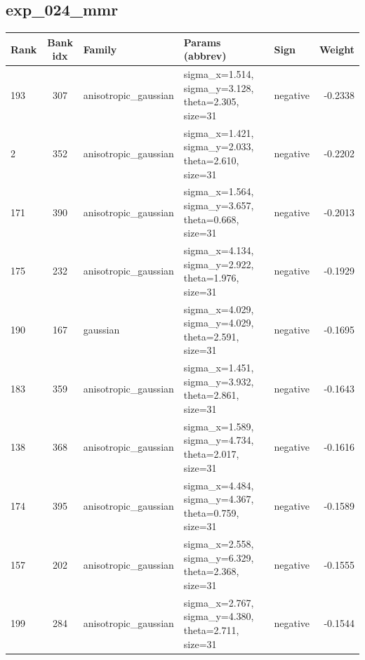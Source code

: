 \documentclass{article}
\begin{document}
\subsection*{exp\_024\_mmr}
\begin{center}
\begin{tabular}{lclllr}
\toprule
Rank & Bank idx & Family & Params (abbrev) & Sign & Weight \\
\midrule

193 & 307 & anisotropic\_gaussian & sigma\_x=1.514, sigma\_y=3.128, theta=2.305, size=31 & negative & -0.2338 \\
2 & 352 & anisotropic\_gaussian & sigma\_x=1.421, sigma\_y=2.033, theta=2.610, size=31 & negative & -0.2202 \\
171 & 390 & anisotropic\_gaussian & sigma\_x=1.564, sigma\_y=3.657, theta=0.668, size=31 & negative & -0.2013 \\
175 & 232 & anisotropic\_gaussian & sigma\_x=4.134, sigma\_y=2.922, theta=1.976, size=31 & negative & -0.1929 \\
190 & 167 & gaussian & sigma\_x=4.029, sigma\_y=4.029, theta=2.591, size=31 & negative & -0.1695 \\
183 & 359 & anisotropic\_gaussian & sigma\_x=1.451, sigma\_y=3.932, theta=2.861, size=31 & negative & -0.1643 \\
138 & 368 & anisotropic\_gaussian & sigma\_x=1.589, sigma\_y=4.734, theta=2.017, size=31 & negative & -0.1616 \\
174 & 395 & anisotropic\_gaussian & sigma\_x=4.484, sigma\_y=4.367, theta=0.759, size=31 & negative & -0.1589 \\
157 & 202 & anisotropic\_gaussian & sigma\_x=2.558, sigma\_y=6.329, theta=2.368, size=31 & negative & -0.1555 \\
199 & 284 & anisotropic\_gaussian & sigma\_x=2.767, sigma\_y=4.380, theta=2.711, size=31 & negative & -0.1544 \\
\bottomrule
\end{tabular}
\end{center}
\end{document}
